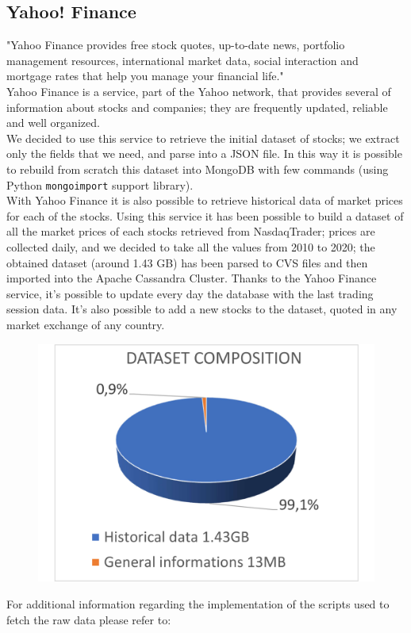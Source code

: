 \subsection{Yahoo! Finance}
"Yahoo Finance provides free stock quotes, up-to-date news, portfolio management
resources, international market data, social interaction and mortgage rates that
help you manage your financial life."\\
Yahoo Finance is a service, part of the Yahoo network, that provides several of
information about stocks and companies; they are frequently updated, reliable
and well organized.\\
We decided to use this service to retrieve the initial dataset of stocks; we
extract only the fields that we need, and parse into a JSON file. In this way it
is possible to rebuild from scratch this dataset into MongoDB with few commands
(using Python \texttt{mongoimport} support library).\\
With Yahoo Finance it is also possible to retrieve historical data of market
prices for each of the stocks. Using this service it has been possible to build
a dataset of all the market prices of each stocks retrieved from NasdaqTrader;
prices are collected daily, and we decided to take all the values from 2010 to
2020; the obtained dataset (around 1.43 GB) has been parsed to CVS files and then
imported into the Apache Cassandra Cluster. Thanks to the Yahoo Finance service,
it's possible to update every day the database with the last trading session
data. It's also possible to add a new stocks to the dataset, quoted in any
market exchange of any country.
\begin{figure}[H]
	\begin{center}
		\includegraphics[scale=0.12]{img/dataset_comp.png}
	\end{center}
	\vspace{-0.6cm}
\end{figure}
\noindent
For additional information regarding the implementation of the scripts used to
fetch the raw data please refer to:
\vspace{0.2cm}
